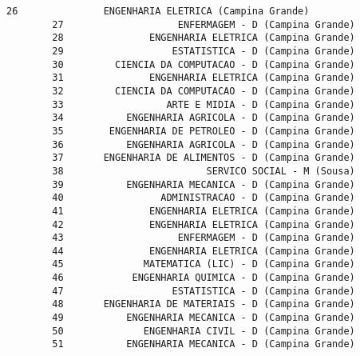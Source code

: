 \documentclass[11pt]{article}
\begin{document}
\begin{Verbatim}[commandchars=\\\{\}]
        26               ENGENHARIA ELETRICA (Campina Grande)   
        27                    ENFERMAGEM - D (Campina Grande)   
        28               ENGENHARIA ELETRICA (Campina Grande)   
        29                   ESTATISTICA - D (Campina Grande)   
        30         CIENCIA DA COMPUTACAO - D (Campina Grande)   
        31               ENGENHARIA ELETRICA (Campina Grande)   
        32         CIENCIA DA COMPUTACAO - D (Campina Grande)   
        33                  ARTE E MIDIA - D (Campina Grande)   
        34           ENGENHARIA AGRICOLA - D (Campina Grande)   
        35        ENGENHARIA DE PETROLEO - D (Campina Grande)   
        36           ENGENHARIA AGRICOLA - D (Campina Grande)   
        37       ENGENHARIA DE ALIMENTOS - D (Campina Grande)   
        38                         SERVICO SOCIAL - M (Sousa)   
        39           ENGENHARIA MECANICA - D (Campina Grande)   
        40                 ADMINISTRACAO - D (Campina Grande)   
        41               ENGENHARIA ELETRICA (Campina Grande)   
        42               ENGENHARIA ELETRICA (Campina Grande)   
        43                    ENFERMAGEM - D (Campina Grande)   
        44               ENGENHARIA ELETRICA (Campina Grande)   
        45              MATEMATICA (LIC) - D (Campina Grande)   
        46            ENGENHARIA QUIMICA - D (Campina Grande)   
        47                   ESTATISTICA - D (Campina Grande)   
        48       ENGENHARIA DE MATERIAIS - D (Campina Grande)   
        49           ENGENHARIA MECANICA - D (Campina Grande)   
        50              ENGENHARIA CIVIL - D (Campina Grande)   
        51           ENGENHARIA MECANICA - D (Campina Grande)   
        

\end{Verbatim}
\end{document}
